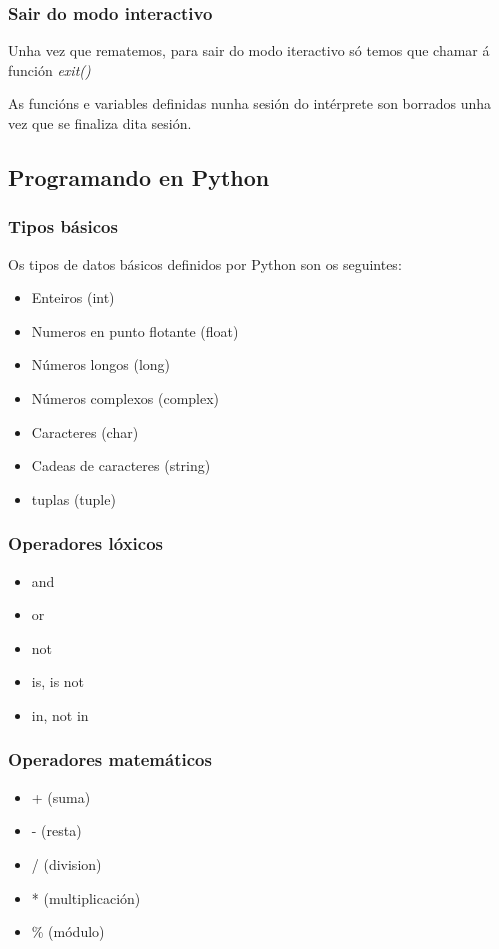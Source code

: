 \begin{frame}
  \frametitle{Sair do modo interactivo}
  Unha vez que rematemos, para sair do modo iteractivo só temos que chamar á
  función \emph{exit()}

  As funcións e variables definidas nunha sesión do intérprete son borrados unha
  vez que se finaliza dita sesión.
\end{frame}

\subsection{Programando en Python}
\label{subsec:Programando}

\begin{frame}
  \frametitle{Tipos básicos}
  Os tipos de datos básicos definidos por Python son os seguintes:
  \begin{itemize}
  \item Enteiros (int)
  \item Numeros en punto flotante (float)
  \item Números longos (long)
  \item Números complexos (complex)
  \item Caracteres (char)
  \item Cadeas de caracteres (string)
  \item tuplas (tuple)
  \end{itemize}
\end{frame}

\begin{frame}
  \frametitle{Operadores lóxicos}
  \begin{itemize}
  \item and
  \item or
  \item not
  \item is, is not
  \item in, not in
  \end{itemize}
\end{frame}

\begin{frame}
  \frametitle{Operadores matemáticos}
  \begin{itemize}
  \item + (suma)
  \item - (resta)
  \item / (division)
  \item * (multiplicación)
  \item \% (módulo)
  \end{itemize}
\end{frame}


